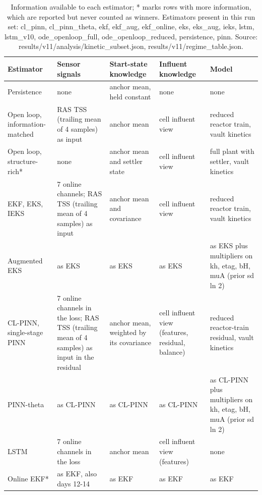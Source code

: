 \begin{table}[t]
\centering
\caption{Information available to each estimator; * marks rows with more information, which are reported but never counted as winners. Estimators present in this run set: cl\_pinn, cl\_pinn\_theta, ekf, ekf\_aug, ekf\_online, eks, eks\_aug, ieks, lstm, lstm\_v10, ode\_openloop\_full, ode\_openloop\_reduced, persistence, pinn. Source: results/v11/analysis/kinetic\_subset.json, results/v11/regime\_table.json.}
\label{tab:information}
\footnotesize
\begin{tabular}{lllll}
\toprule
Estimator & Sensor signals & Start-state knowledge & Influent knowledge & Model \\
\midrule
Persistence & none & anchor mean, held constant & none & none \\
Open loop, information-matched & RAS TSS (trailing mean of 4 samples) as input & anchor mean & cell influent view & reduced reactor train, vault kinetics \\
Open loop, structure-rich* & none & anchor mean and settler state & cell influent view & full plant with settler, vault kinetics \\
EKF, EKS, IEKS & 7 online channels; RAS TSS (trailing mean of 4 samples) as input & anchor mean and covariance & cell influent view & reduced reactor train, vault kinetics \\
Augmented EKS & as EKS & as EKS & as EKS & as EKS plus multipliers on kh, etag, bH, muA (prior sd ln 2) \\
CL-PINN, single-stage PINN & 7 online channels in the loss; RAS TSS (trailing mean of 4 samples) as input in the residual & anchor mean, weighted by its covariance & cell influent view (features, residual, balance) & reduced reactor-train residual, vault kinetics \\
PINN-theta & as CL-PINN & as CL-PINN & as CL-PINN & as CL-PINN plus multipliers on kh, etag, bH, muA (prior sd ln 2) \\
LSTM & 7 online channels in the loss & anchor mean & cell influent view (features) & none \\
Online EKF* & as EKF, also days 12-14 & as EKF & as EKF & as EKF \\
\bottomrule
\end{tabular}
\end{table}
